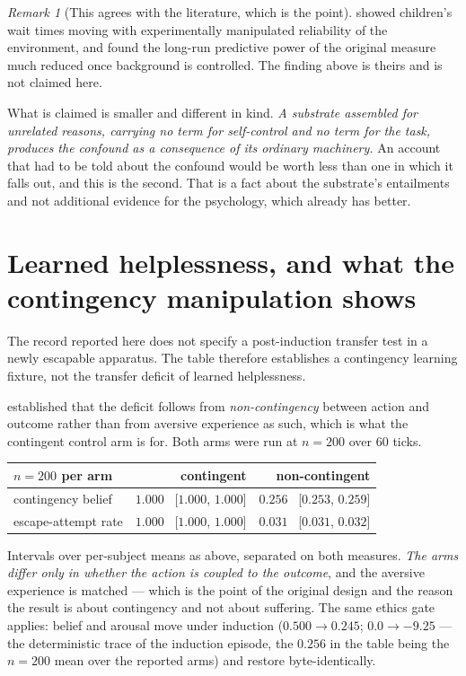 \documentclass[11pt,a4paper]{article}
\theoremstyle{remark}
\newtheorem{remark}[definition]{Remark}
\begin{document}
\begin{remark}[This agrees with the literature, which is the point]\label{rem:priority}
\citet{kidd2013} showed children's wait times moving with experimentally manipulated reliability of
the environment, and \citet{watts2018} found the long-run predictive power of the original measure
much reduced once background is controlled. The finding above is theirs and is not claimed here.

What is claimed is smaller and different in kind. \emph{A substrate assembled for unrelated reasons,
carrying no term for self-control and no term for the task, produces the confound as a consequence
of its ordinary machinery.} An account that had to be told about the confound would be worth less
than one in which it falls out, and this is the second. That is a fact about the substrate's
entailments and not additional evidence for the psychology, which already has better.
\end{remark}

\section{Learned helplessness, and what the contingency manipulation shows}\label{sec:helplessness}
The record reported here does not specify a post-induction transfer test in
a newly escapable apparatus. The table therefore establishes a contingency
learning fixture, not the transfer deficit of learned helplessness.

\citet{seligman1967} established that the deficit follows from \emph{non-contingency} between action
and outcome rather than from aversive experience as such, which is what the contingent control arm is
for. Both arms were run at $n=200$ over $60$ ticks.

\begin{center}\small
\begin{tabular}{@{}lrr@{}}
\toprule
$n=200$ per arm & \textbf{contingent} & \textbf{non-contingent}\\
\midrule
contingency belief & $1.000$ \ [$1.000$, $1.000$] & $0.256$ \ [$0.253$, $0.259$]\\
escape-attempt rate & $1.000$ \ [$1.000$, $1.000$] & $0.031$ \ [$0.031$, $0.032$]\\
\bottomrule
\end{tabular}
\end{center}

Intervals over per-subject means as above, separated on both measures. \emph{The arms differ only in
whether the action is coupled to the outcome}, and the aversive experience is matched --- which is
the point of the original design and the reason the result is about contingency and not about
suffering. The same ethics gate applies: belief and arousal move under induction
($0.500 \rightarrow 0.245$; $0.0 \rightarrow -9.25$ --- the deterministic trace of the induction
episode, the $0.256$ in the table being the $n=200$ mean over the reported arms) and restore
byte-identically.
\end{document}
